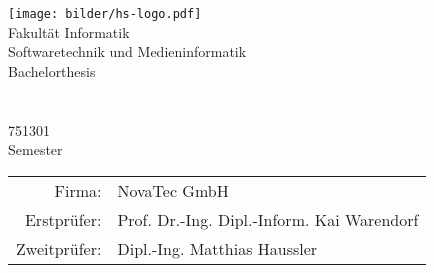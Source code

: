 \begin{titlepage}
	\begin{center}
		\texttt{[image: bilder/hs-logo.pdf]}\\
		\vspace{1cm} \Large Fakultät Informatik\\
		\vspace{0.5cm} \Large Softwaretechnik und Medieninformatik\\
		\vspace{1.25cm} \Large Bachelorthesis\\
		\vspace{0.5cm} \Huge \thetitle \\
		\vspace{1.5cm} \Large \theauthor \\
		\vspace{0.2cm} \small 751301\\
		\vspace{0.5cm} \normalsize Semester \the\year\\
		\vfill
		
		\begin{tabular}{rl}
			Firma: & NovaTec GmbH\\ [0.1cm]
			Erstprüfer: & Prof. Dr.-Ing. Dipl.-Inform. Kai Warendorf \\ [0.1cm]
			Zweitprüfer: & Dipl.-Ing. Matthias Haussler\\[0.5cm]
		\end{tabular}
	\end{center}
\end{titlepage}